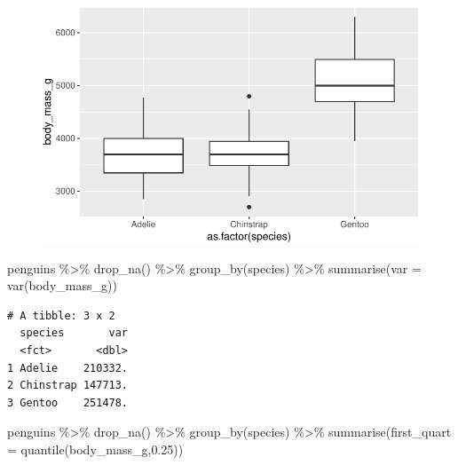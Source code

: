\documentclass[
  letterpaper,
  DIV=11,
  numbers=noendperiod]{scrreprt}
\newenvironment{Shaded}{\begin{snugshade}}{\end{snugshade}}
\newcommand{\AttributeTok}[1]{\textcolor[rgb]{0.40,0.45,0.13}{#1}}
\newcommand{\FloatTok}[1]{\textcolor[rgb]{0.68,0.00,0.00}{#1}}
\newcommand{\FunctionTok}[1]{\textcolor[rgb]{0.28,0.35,0.67}{#1}}
\newcommand{\NormalTok}[1]{\textcolor[rgb]{0.00,0.23,0.31}{#1}}
\newcommand{\SpecialCharTok}[1]{\textcolor[rgb]{0.37,0.37,0.37}{#1}}
\begin{document}
\begin{figure}[H]

{\centering \includegraphics{./02-probdist_files/figure-pdf/unnamed-chunk-5-1.pdf}

}

\end{figure}

\begin{Shaded}
\begin{Highlighting}[]
\NormalTok{penguins }\SpecialCharTok{\%\textgreater{}\%} \FunctionTok{drop\_na}\NormalTok{() }\SpecialCharTok{\%\textgreater{}\%} \FunctionTok{group\_by}\NormalTok{(species) }\SpecialCharTok{\%\textgreater{}\%} \FunctionTok{summarise}\NormalTok{(}\AttributeTok{var =} \FunctionTok{var}\NormalTok{(body\_mass\_g))}
\end{Highlighting}
\end{Shaded}

\begin{verbatim}
# A tibble: 3 x 2
  species       var
  <fct>       <dbl>
1 Adelie    210332.
2 Chinstrap 147713.
3 Gentoo    251478.
\end{verbatim}

\begin{Shaded}
\begin{Highlighting}[]
\NormalTok{penguins }\SpecialCharTok{\%\textgreater{}\%} \FunctionTok{drop\_na}\NormalTok{() }\SpecialCharTok{\%\textgreater{}\%} \FunctionTok{group\_by}\NormalTok{(species) }\SpecialCharTok{\%\textgreater{}\%} \FunctionTok{summarise}\NormalTok{(}\AttributeTok{first\_quart =} \FunctionTok{quantile}\NormalTok{(body\_mass\_g,}\FloatTok{0.25}\NormalTok{))}
\end{Highlighting}
\end{Shaded}
\end{document}
